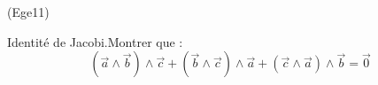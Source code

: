 \begin{tiny}(Ege11)\end{tiny} Identité de Jacobi.Montrer que :
\begin{displaymath}
 (\overrightarrow a \wedge \overrightarrow b)\wedge \overrightarrow c +
 (\overrightarrow b \wedge \overrightarrow c)\wedge \overrightarrow a +
 (\overrightarrow c \wedge \overrightarrow a)\wedge \overrightarrow b 
 = \overrightarrow 0
\end{displaymath}
 